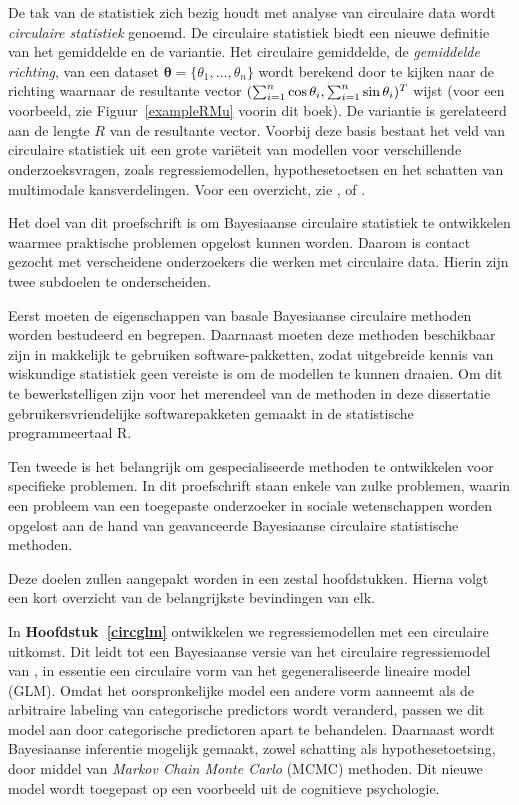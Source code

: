 \documentclass[12pt, a4paper]{book}\usepackage[]{graphicx}\usepackage{xcolor}
\let\proglang=\textsf
\begin{document}
De tak van de statistiek zich bezig houdt met analyse van circulaire data wordt \textit{circulaire statistiek} genoemd. De circulaire statistiek biedt een nieuwe definitie van het gemiddelde en de variantie. Het circulaire gemiddelde, de \textit{gemiddelde richting}, van een dataset $\boldsymbol{\theta} = \{\theta_1, \dots, \theta_n\}$ wordt berekend door te kijken naar de richting waarnaar de resultante vector $(\sum_{i=1}^n\cos\theta_i, \sum_{i=1}^n\sin\theta_i)^T$ wijst (voor een voorbeeld, zie Figuur~\ref{exampleRMu} voorin dit boek). De variantie is gerelateerd aan de lengte $R$ van de resultante vector. Voorbij deze basis bestaat het veld van circulaire statistiek uit een grote vari\"eteit van modellen voor verschillende onderzoeksvragen, zoals regressiemodellen, hypothesetoetsen en het schatten van multimodale kansverdelingen. Voor een overzicht, zie \citet{fisher1995statistical}, \citet{mardia2009directional} of \citet{pewsey2013circular}.

Het doel van dit proefschrift is om Bayesiaanse circulaire statistiek te ontwikkelen waarmee praktische problemen opgelost kunnen worden. Daarom is contact gezocht met verscheidene onderzoekers die werken met circulaire data. Hierin zijn twee subdoelen te onderscheiden.

Eerst moeten de eigenschappen van basale Bayesiaanse circulaire methoden worden bestudeerd en begrepen. Daarnaast moeten deze methoden beschikbaar zijn in makkelijk te gebruiken software-pakketten, zodat uitgebreide kennis van wiskundige statistiek geen vereiste is om de modellen te kunnen draaien. Om dit te bewerkstelligen zijn voor het merendeel van de methoden in deze dissertatie gebruikersvriendelijke softwarepakketen gemaakt in de statistische programmeertaal \proglang{R}.

Ten tweede is het belangrijk om gespecialiseerde methoden te ontwikkelen voor specifieke problemen. In dit proefschrift staan enkele van zulke problemen, waarin een probleem van een toegepaste onderzoeker in sociale wetenschappen worden opgelost aan de hand van geavanceerde Bayesiaanse circulaire statistische methoden.

Deze doelen zullen aangepakt worden in een zestal hoofdstukken. Hierna volgt een kort overzicht van de belangrijkste bevindingen van elk.

In \textbf{Hoofdstuk~\ref{circglm}} ontwikkelen we regressiemodellen met een circulaire uitkomst. Dit leidt tot een Bayesiaanse versie van het circulaire regressiemodel van \citet{fisher1992regression}, in essentie een circulaire vorm van het gegeneraliseerde lineaire model (GLM). Omdat het oorspronkelijke model een andere vorm aanneemt als de arbitraire labeling van categorische predictors wordt veranderd, passen we dit model aan door categorische predictoren apart te behandelen. Daarnaast wordt Bayesiaanse inferentie mogelijk gemaakt, zowel schatting als hypothesetoetsing, door middel van \textit{Markov Chain Monte Carlo} (MCMC) methoden. Dit nieuwe model wordt toegepast op een voorbeeld uit de cognitieve psychologie.
\end{document}
